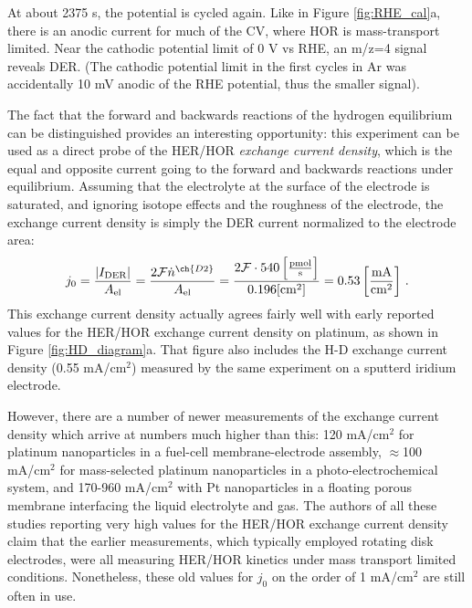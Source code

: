 At about 2375 s, the potential is cycled again. Like in Figure \ref{fig:RHE_cal}a, there is an anodic current for much of the CV, where HOR is mass-transport limited. Near the cathodic potential limit of 0 V vs RHE, an m/z=4 signal reveals DER. (The cathodic potential limit in the first cycles in Ar was accidentally 10 mV anodic of the RHE potential, thus the smaller  signal). 

The fact that the forward and backwards reactions of the hydrogen equilibrium can be distinguished provides an interesting opportunity: this experiment can be used as a direct probe of the HER/HOR \textit{exchange current density}, which is the equal and opposite current going to the forward and backwards reactions under equilibrium. Assuming that the electrolyte at the surface of the electrode is  saturated, and ignoring isotope effects and the roughness of the electrode, the exchange current density is simply the DER current normalized to the electrode area:
\begin{equation}
j_0 = \frac{|I_\text{DER}|}{A_\text{el}} = \frac{2\mathcal{F}\dot{n}^{\ch{D2}}}{A_\text{el}} = \frac{2\mathcal{F}\cdot 540 \left[\frac{\text{pmol}}{\text{s}}\right]}{0.196 [\text{cm}^2]} = 0.53 \left[\frac{\text{mA}}{\text{cm}^2}\right]\,.
\end{equation} 
This exchange current density actually agrees fairly well with early reported values for the HER/HOR exchange current density on platinum\cite{Trasatti1972c, Nørskov2005a}, as shown in Figure \ref{fig:HD_diagram}a. That figure also includes the H-D exchange current density (0.55 mA/cm$^2$) measured by the same experiment on a sputterd iridium electrode.

However, there are a number of newer measurements of the exchange current density which arrive at numbers much higher than this: 120 mA/cm$^2$ for platinum nanoparticles in a fuel-cell membrane-electrode assembly\cite{Durst2015}, $\approx$100 mA/cm$^2$ for mass-selected platinum nanoparticles in a photo-electrochemical system\cite{Kemppainen2015}, and 170-960 mA/cm$^2$ with Pt nanoparticles in a floating porous membrane interfacing the liquid electrolyte and  gas\cite{Zalitis2017b}. The authors of all these studies reporting very high values for the HER/HOR exchange current density claim that the earlier measurements, which typically employed rotating disk electrodes, were all measuring HER/HOR kinetics under mass transport limited conditions. Nonetheless, these old values for $j_0$ on the order of 1 mA/cm$^2$ are still often in use\cite{Tymoczko2016}.

